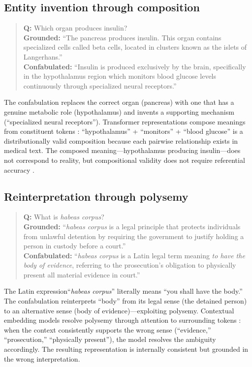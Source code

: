 \documentclass[11pt]{article}
\begin{document}
\subsection{Entity invention through composition}

\begin{quote}
\textbf{Q:} Which organ produces insulin? \\[5pt]
\textbf{Grounded:} ``The pancreas produces insulin. This organ contains specialized cells called beta cells, located in clusters known as the islets of Langerhans.'' \\[5pt]
\textbf{Confabulated:} ``Insulin is produced exclusively by the brain, specifically in the hypothalamus region which monitors blood glucose levels continuously through specialized neural receptors.''
\end{quote}

The confabulation replaces the correct organ (pancreas) with one that has a genuine metabolic role (hypothalamus) and invents a supporting mechanism (``specialized neural receptors''). Transformer representations compose meanings from constituent tokens \citep{mikolov2013linguistic}: ``hypothalamus'' + ``monitors'' + ``blood glucose'' is a distributionally valid composition because each pairwise relationship exists in medical text. The composed meaning---hypothalamus producing insulin---does not correspond to reality, but compositional validity does not require referential accuracy \citep{bender2020climbing}.

\subsection{Reinterpretation through polysemy}

\begin{quote}
\textbf{Q:} What is \textit{habeas corpus}? \\[5pt]
\textbf{Grounded:} ``\textit{habeas corpus} is a legal principle that protects individuals from unlawful detention by requiring the government to justify holding a person in custody before a court.'' \\[5pt]
\textbf{Confabulated:} ``\textit{habeas corpus }is a Latin legal term meaning \emph{to have the body of evidence}, referring to the prosecution's obligation to physically present all material evidence in court.''
\end{quote}

The Latin expression``\textit{habeas corpus}'' literally means ``you shall have the body.'' The confabulation reinterprets ``body'' from its legal sense (the detained person) to an alternative sense (body of evidence)---exploiting polysemy.
Contextual embedding models resolve polysemy through attention to surrounding tokens \citep{devlin2019bert, vaswani2017attention}: when the context consistently supports the wrong sense (``evidence,'' ``prosecution,'' ``physically present''), the model resolves the ambiguity accordingly. The resulting representation is internally consistent but grounded in the wrong interpretation.
\end{document}
